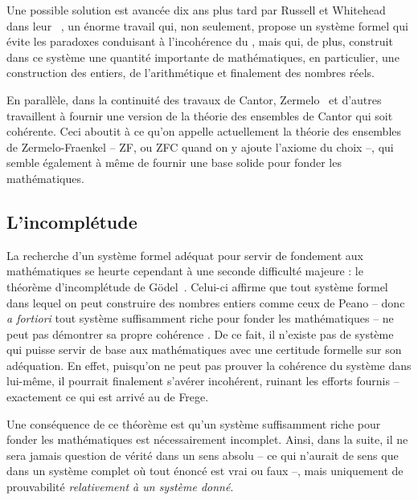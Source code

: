 Une possible solution est avancée dix ans plus tard
par Russell et Whitehead dans leur ~,
un énorme travail qui, non seulement, propose un système
formel qui évite les paradoxes conduisant à l’incohérence du
, mais qui, de plus, construit
dans ce système une quantité importante de mathématiques,
en particulier, une construction des entiers, de l’arithmétique et
finalement des nombres réels.

En parallèle, dans la continuité des travaux de Cantor,
Zermelo~ et
d’autres travaillent à fournir une version de la théorie des ensembles de Cantor
qui soit cohérente. Ceci aboutit à ce qu’on appelle actuellement la
théorie des ensembles de Zermelo-Fraenkel – ZF, ou ZFC quand on y ajoute l’axiome
du choix %
–, qui semble également à même de fournir une base solide pour fonder les
mathématiques.

\subsection{L’incomplétude}

La recherche d’un système formel adéquat pour servir de fondement aux mathématiques 
se heurte cependant à une seconde difficulté majeure : le théorème d’incomplétude de
Gödel~. Celui-ci affirme que tout système formel
dans lequel on peut construire des nombres entiers comme ceux de Peano – donc
\textit{a fortiori} tout système suffisamment riche pour fonder les mathématiques –
ne peut pas démontrer sa propre cohérence%
.
De ce fait, il n’existe pas de
système qui puisse servir de base aux mathématiques
avec une certitude formelle sur son adéquation.
En effet, puisqu’on ne peut pas prouver la cohérence du
système dans lui-même, il pourrait finalement s’avérer incohérent, ruinant les
efforts fournis – exactement ce qui est arrivé au  de Frege.

Une conséquence de ce théorème est qu’un système suffisamment riche
pour fonder les mathématiques est nécessairement incomplet.%
Ainsi, dans la suite, il ne sera jamais question de vérité dans un sens absolu –
ce qui n’aurait de sens que dans un système complet
où tout énoncé est vrai ou faux –, mais
uniquement de prouvabilité \emph{relativement à un système donné}.

